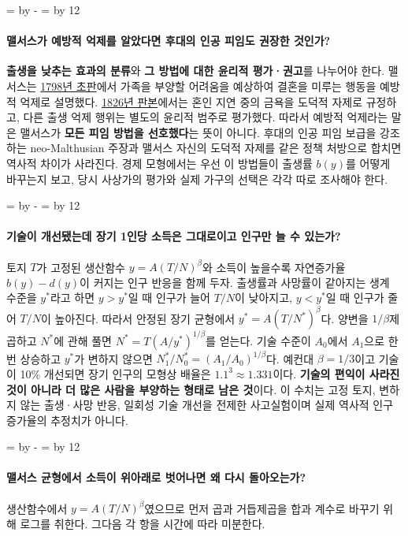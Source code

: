 \documentclass[10pt,a4paper]{article}
\newcommand{\ReserveQuestionSpace}{%
  \par\begingroup
  \dimen0=\pagegoal \advance\dimen0 by -\pagetotal
  \dimen2=\baselineskip \multiply\dimen2 by 12
  \ifdim\dimen0<\dimen2 \newpage\fi
  \endgroup}
\begin{document}
\ReserveQuestionSpace
\paragraph{맬서스가 예방적 억제를 알았다면 후대의 인공 피임도 권장한 것인가?}
\textbf{출생을 낮추는 효과의 분류}와 \textbf{그 방법에 대한 윤리적 평가·권고}를 나누어야 한다. 맬서스는 \href{https://www.gutenberg.org/files/4239/4239-h/4239-h.htm}{1798년 초판}에서 가족을 부양할 어려움을 예상하여 결혼을 미루는 행동을 예방적 억제로 설명했다. \href{https://dev.oll.libertyfund.org/titles/malthus-an-essay-on-the-principle-of-population-vol-1-1826-6th-ed}{1826년 판본}에서는 혼인 지연 중의 금욕을 도덕적 자제로 규정하고, 다른 출생 억제 행위는 별도의 윤리적 범주로 평가했다. 따라서 예방적 억제라는 말은 맬서스가 \textbf{모든 피임 방법을 선호했다}는 뜻이 아니다. 후대의 인공 피임 보급을 강조하는 neo-Malthusian 주장과 맬서스 자신의 도덕적 자제를 같은 정책 처방으로 합치면 역사적 차이가 사라진다. 경제 모형에서는 우선 이 방법들이 출생률 $b(y)$를 어떻게 바꾸는지 보고, 당시 사상가의 평가와 실제 가구의 선택은 각각 따로 조사해야 한다.\par

\ReserveQuestionSpace
\paragraph{기술이 개선됐는데 장기 1인당 소득은 그대로이고 인구만 늘 수 있는가?}

토지 $T$가 고정된 생산함수 $y=A(T/N)^\beta$와 소득이 높을수록 자연증가율 $b(y)-d(y)$이 커지는 인구 반응을 함께 두자. 출생률과 사망률이 같아지는 생계 수준을 $y^*$라고 하면 $y>y^*$일 때 인구가 늘어 $T/N$이 낮아지고, $y<y^*$일 때 인구가 줄어 $T/N$이 높아진다. 따라서 안정된 장기 균형에서 $y^*=A(T/N^*)^\beta$다. 양변을 $1/\beta$제곱하고 $N^*$에 관해 풀면 $N^*=T(A/y^*)^{1/\beta}$를 얻는다. 기술 수준이 $A_0$에서 $A_1$으로 한 번 상승하고 $y^*$가 변하지 않으면 $N_1^*/N_0^*=(A_1/A_0)^{1/\beta}$다. 예컨대 $\beta=1/3$이고 기술이 10\% 개선되면 장기 인구의 모형상 배율은 $1.1^3\approx1.331$이다. \textbf{기술의 편익이 사라진 것이 아니라 더 많은 사람을 부양하는 형태로 남은 것}이다. 이 수치는 고정 토지, 변하지 않는 출생·사망 반응, 일회성 기술 개선을 전제한 사고실험이며 실제 역사적 인구 증가율의 추정치가 아니다.\par

\ReserveQuestionSpace
\paragraph{맬서스 균형에서 소득이 위아래로 벗어나면 왜 다시 돌아오는가?}
생산함수에서 $y=A(T/N)^\beta$였으므로 먼저 곱과 거듭제곱을 합과 계수로 바꾸기 위해 로그를 취한다. 그다음 각 항을 시간에 따라 미분한다.\par
\end{document}
